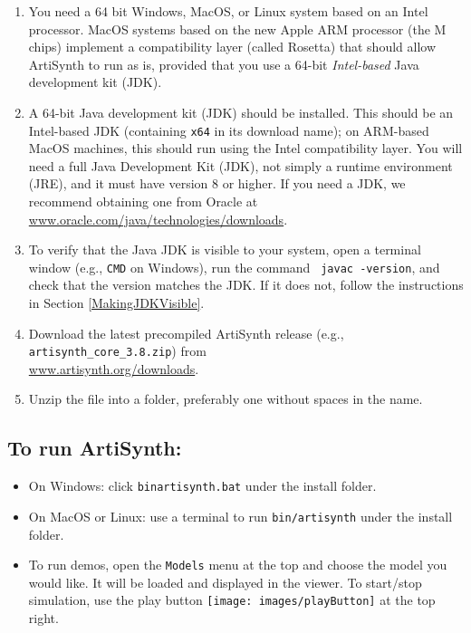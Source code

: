 \documentclass{article}
\begin{document}
\begin{enumerate}

\item You need a 64 bit Windows, MacOS, or Linux system based on an Intel
processor. MacOS systems based on the new Apple ARM processor (the M
chips) implement a compatibility layer (called Rosetta) that should allow
ArtiSynth to run as is, provided that you use a 64-bit {\it Intel-based} Java
development kit (JDK).

\item A 64-bit Java development kit (JDK) should be installed. This should be
an Intel-based JDK (containing {\tt x64} in its download name); on ARM-based
MacOS machines, this should run using the Intel compatibility layer.
You will need a full Java Development Kit (JDK), not simply a runtime
environment (JRE), and it must have version 8 or higher. If you need
a JDK, we recommend obtaining one from Oracle at
\href{https://www.oracle.com/java/technologies/downloads/}%
{www.oracle.com/java/technologies/downloads}.
 
\item To verify that the Java JDK is visible to your system, open a
terminal window (e.g., {\tt CMD} on Windows), run the command {\tt
javac -version}, and check that the version matches the JDK.  If it
does not, follow the instructions in Section
\ref{MakingJDKVisible}.

\item Download the latest precompiled ArtiSynth release 
(e.g., {\tt artisynth\_core\_3.8.zip}) from
\iflatexml\else\\\fi %
\href{https://www.artisynth.org/downloads}{www.artisynth.org/downloads}.
 
\item Unzip the file into a folder, preferably one without spaces in the
name.

\end{enumerate}
 
\subsection{To run ArtiSynth:}

\begin{itemize}[leftmargin=26pt]
 
\item On Windows: click {\tt bin\BKS artisynth.bat} under the install folder. 
 
\item On MacOS or Linux: use a terminal to run {\tt bin/artisynth} 
under the install folder.

\item[\ ] To run demos, open the {\tt Models} menu at the top and
choose the model you would like. It will be loaded and displayed in
the viewer. To start/stop simulation, use the play button
\texttt{[image: images/playButton]} at the top right.

\end{itemize}
\end{document}
